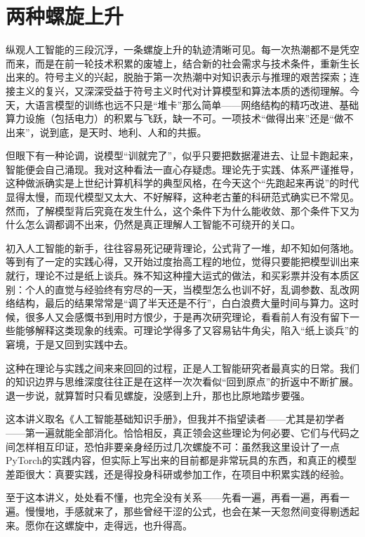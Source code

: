 \section{两种螺旋上升}

纵观人工智能的三段沉浮，一条螺旋上升的轨迹清晰可见。每一次热潮都不是凭空而来，而是在前一轮技术积累的废墟上，结合新的社会需求与技术条件，重新生长出来的。符号主义的兴起，脱胎于第一次热潮中对知识表示与推理的艰苦探索；连接主义的复兴，又深深受益于符号主义时代对计算模型和算法本质的透彻理解。今天，大语言模型的训练也远不只是“堆卡”那么简单——网络结构的精巧改进、基础算力设施（包括电力）的积累与飞跃，缺一不可。一项技术“做得出来”还是“做不出来”，说到底，是天时、地利、人和的共振。

但眼下有一种论调，说模型“训就完了”，似乎只要把数据灌进去、让显卡跑起来，智能便会自己涌现。我对这种看法一直心存疑虑。理论先于实践、体系严谨推导，这种做派确实是上世纪计算机科学的典型风格，在今天这个“先跑起来再说”的时代显得太慢，而现代模型又太大、不好解释，这种老古董的科研范式确实已不常见。然而，了解模型背后究竟在发生什么，这个条件下为什么能收敛、那个条件下又为什么怎么调都调不出来，仍然是真正理解人工智能不可绕开的关口。

初入人工智能的新手，往往容易死记硬背理论，公式背了一堆，却不知如何落地。等到有了一定的实践心得，又开始过度抬高工程的地位，觉得只要能把模型训出来就行，理论不过是纸上谈兵。殊不知这种撞大运式的做法，和买彩票并没有本质区别：个人的直觉与经验终有穷尽的一天，当模型怎么也训不好，乱调参数、乱改网络结构，最后的结果常常是“调了半天还是不行”，白白浪费大量时间与算力。这时候，很多人又会感慨书到用时方恨少，于是再次研究理论，看看前人有没有留下一些能够解释这类现象的线索。可理论学得多了又容易钻牛角尖，陷入“纸上谈兵”的窘境，于是又回到实践中去。

这种在理论与实践之间来来回回的过程，正是人工智能研究者最真实的日常。我们的知识边界与思维深度往往正是在这样一次次看似“回到原点”的折返中不断扩展。退一步说，就算暂时只看见螺旋，没感到上升，那也比原地踏步要强。

这本讲义取名《人工智能基础知识手册》，但我并不指望读者——尤其是初学者——第一遍就能全部消化。恰恰相反，真正领会这些理论为何必要、它们与代码之间怎样相互印证，恐怕非要亲身经历过几次螺旋不可：虽然我这里设计了一点PyTorch的实践内容，但实际上写出来的目前都是非常玩具的东西，和真正的模型差距很大：真要实践，还是得投身科研或参加工作，在项目中积累实践的经验。

至于这本讲义，处处看不懂，也完全没有关系——先看一遍，再看一遍，再看一遍。慢慢地，手感就来了，那些曾经干涩的公式，也会在某一天忽然间变得剔透起来。愿你在这螺旋中，走得远，也升得高。
